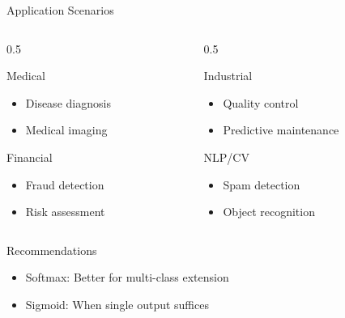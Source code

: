 \documentclass{beamer}
\begin{document}
	\begin{frame}{Application Scenarios}
		\begin{columns}
			\begin{column}{0.5\textwidth}
				\begin{block}{Medical}
					\begin{itemize}
						\item Disease diagnosis
						\item Medical imaging
					\end{itemize}
				\end{block}
				
				\begin{block}{Financial}
					\begin{itemize}
						\item Fraud detection
						\item Risk assessment
					\end{itemize}
				\end{block}
			\end{column}
			
			\begin{column}{0.5\textwidth}
				\begin{block}{Industrial}
					\begin{itemize}
						\item Quality control
						\item Predictive maintenance
					\end{itemize}
				\end{block}
				
				\begin{block}{NLP/CV}
					\begin{itemize}
						\item Spam detection
						\item Object recognition
					\end{itemize}
				\end{block}
			\end{column}
		\end{columns}
		
		\begin{alertblock}{Recommendations}
			\begin{itemize}
				\item Softmax: Better for multi-class extension
				\item Sigmoid: When single output suffices
			\end{itemize}
		\end{alertblock}
	\end{frame}
	
\end{document}
